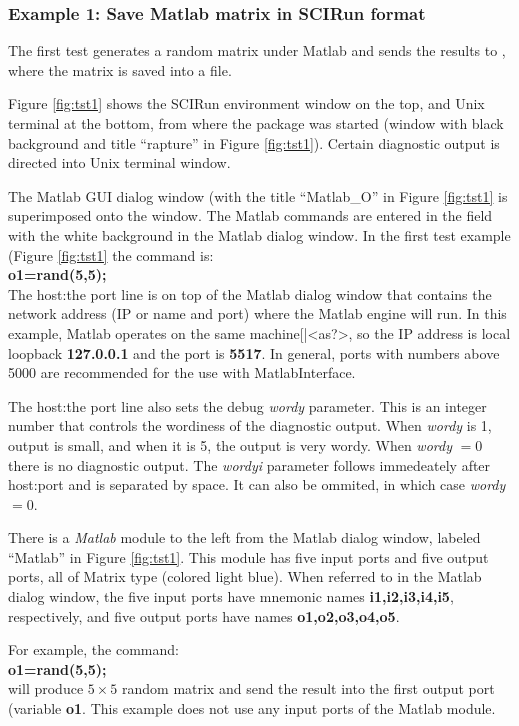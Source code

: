 \subsubsection{Example 1: Save Matlab matrix in SCIRun format} \indent

The first test generates a random matrix under Matlab and sends the
results to \sr{}, where the matrix is saved into a \sr{} file. 

Figure \ref{fig:tst1} shows the SCIRun environment window on the top,
and Unix terminal at the bottom, from where the package was started
(window with black background and title ``rapture'' in Figure 
\ref{fig:tst1}).  Certain diagnostic output is directed into Unix 
terminal window. 

The Matlab GUI dialog window (with the title
``Matlab\_O'' in Figure \ref{fig:tst1} is superimposed onto the \sr{}
window. The Matlab commands are entered in the field with the white
background in the Matlab dialog window.
In the first test example (Figure \ref{fig:tst1}
the command is: \\
{\bf o1=rand(5,5);} \\

The host:the port line is on top of the Matlab dialog window that contains the network address (IP or name and port) where the Matlab 
engine will run. In this example, Matlab operates on the same
machine[|<as?>, so the IP address is local loopback {\bf 127.0.0.1} and 
the port is {\bf 5517}. In general, ports with numbers above 5000
are recommended for the use with MatlabInterface. 

The host:the port line also sets the debug {\it wordy} parameter.
This is an integer number that controls the wordiness
of the diagnostic output. When {\it wordy} is 1, output is small, and
when it is 5, the output is very wordy. When {\it wordy} $=0$ there
is no diagnostic output. The {\it wordyi} parameter follows immedeately after
host:port and is separated by space. It can also be ommited, in which
case {\it wordy} $=0$.

There is a {\it Matlab} module to the left from the Matlab dialog window,
labeled ``Matlab'' in Figure \ref{fig:tst1}. This module has five input
ports and five output ports, all of Matrix type (colored light blue). 
When referred to in the Matlab dialog window, the five input ports have mnemonic 
names {\bf i1,i2,i3,i4,i5}, respectively, and five output ports have
names {\bf o1,o2,o3,o4,o5}. 

For example, the command: \\
{\bf o1=rand(5,5);} \\
will produce $5 \times 5$ random matrix and send the result
into the first output port (variable {\bf o1}. This example does
not use any input ports of the Matlab module.

